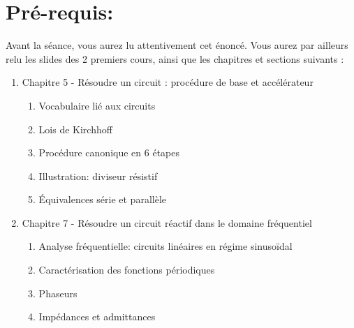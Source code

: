 \section*{Pré-requis:}
Avant la séance, vous aurez lu attentivement cet énoncé. Vous aurez par ailleurs relu les slides des 2 premiers cours, ainsi que les chapitres et sections suivants :

\begin{enumerate}
	\item Chapitre 5 - Résoudre un circuit : procédure de base et accélérateur
	\begin{enumerate}
    \item Vocabulaire lié aux circuits
	\item Lois de Kirchhoff
    \item Procédure canonique en 6 étapes
    \item Illustration: diviseur résistif
    \item Équivalences série et parallèle
    \end{enumerate}
	\item Chapitre 7 - Résoudre un circuit réactif dans le domaine fréquentiel
	\begin{enumerate}
		\item Analyse fréquentielle: circuits linéaires en régime sinusoïdal
        \item Caractérisation des fonctions périodiques
        \item Phaseurs
		\item Impédances et admittances
	\end{enumerate}
\end{enumerate}